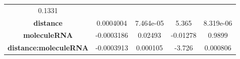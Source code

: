 \documentclass[]{article}
\begin{document}
\begin{longtable}[]{@{}ccccc@{}}
\begin{minipage}[t]{0.13\columnwidth}
0.1331\strut
\end{minipage}\tabularnewline
\begin{minipage}[t]{0.31\columnwidth}\centering\strut
\textbf{distance}\strut
\end{minipage} & \begin{minipage}[t]{0.15\columnwidth}\centering\strut
0.0004004\strut
\end{minipage} & \begin{minipage}[t]{0.15\columnwidth}\centering\strut
7.464e-05\strut
\end{minipage} & \begin{minipage}[t]{0.13\columnwidth}\centering\strut
5.365\strut
\end{minipage} & \begin{minipage}[t]{0.13\columnwidth}\centering\strut
8.319e-06\strut
\end{minipage}\tabularnewline
\begin{minipage}[t]{0.31\columnwidth}\centering\strut
\textbf{moleculeRNA}\strut
\end{minipage} & \begin{minipage}[t]{0.15\columnwidth}\centering\strut
-0.0003186\strut
\end{minipage} & \begin{minipage}[t]{0.15\columnwidth}\centering\strut
0.02493\strut
\end{minipage} & \begin{minipage}[t]{0.13\columnwidth}\centering\strut
-0.01278\strut
\end{minipage} & \begin{minipage}[t]{0.13\columnwidth}\centering\strut
0.9899\strut
\end{minipage}\tabularnewline
\begin{minipage}[t]{0.31\columnwidth}\centering\strut
\textbf{distance:moleculeRNA}\strut
\end{minipage} & \begin{minipage}[t]{0.15\columnwidth}\centering\strut
-0.0003913\strut
\end{minipage} & \begin{minipage}[t]{0.15\columnwidth}\centering\strut
0.000105\strut
\end{minipage} & \begin{minipage}[t]{0.13\columnwidth}\centering\strut
-3.726\strut
\end{minipage} & \begin{minipage}[t]{0.13\columnwidth}\centering\strut
0.000806\strut
\end{minipage}\tabularnewline
\bottomrule
\end{longtable}
\end{document}
